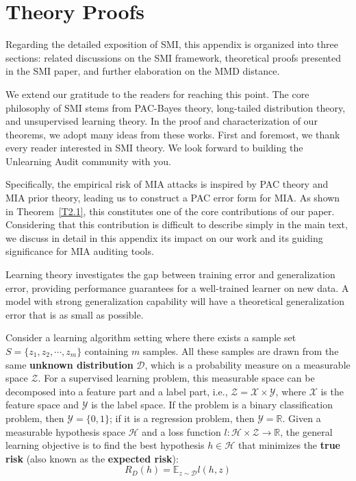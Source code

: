 \documentclass{article}
\theoremstyle{plain}
\theoremstyle{definition}
\theoremstyle{remark}
\begin{document}
\section{Theory Proofs}\label{theory}
Regarding the detailed exposition of SMI, this appendix is organized into three sections: related discussions on the SMI framework, theoretical proofs presented in the SMI paper, and further elaboration on the MMD distance.

We extend our gratitude to the readers for reaching this point. The core philosophy of SMI stems from PAC-Bayes theory, long-tailed distribution theory, and unsupervised learning theory. In the proof and characterization of our theorems, we adopt many ideas from these works. First and foremost, we thank every reader interested in SMI theory. We look forward to building the Unlearning Audit community with you.

Specifically, the empirical risk of MIA attacks is inspired by PAC theory and MIA prior theory, leading us to construct a PAC error form for MIA. As shown in Theorem~\ref{T2.1}, this constitutes one of the core contributions of our paper. Considering that this contribution is difficult to describe simply in the main text, we discuss in detail in this appendix its impact on our work and its guiding significance for MIA auditing tools.

Learning theory investigates the gap between training error and generalization error, providing performance guarantees for a well-trained learner on new data. A model with strong generalization capability will have a theoretical generalization error that is as small as possible.

Consider a learning algorithm setting where there exists a sample set $S = \{z_1, z_2, \cdots, z_m\}$ containing $m$ samples. All these samples are drawn from the same \textbf{unknown distribution} $\mathcal{D}$, which is a probability measure on a measurable space $\mathcal{Z}$. For a supervised learning problem, this measurable space can be decomposed into a feature part and a label part, i.e., $\mathcal{Z} = \mathcal{X} \times \mathcal{Y}$, where $\mathcal{X}$ is the feature space and $\mathcal{Y}$ is the label space. If the problem is a binary classification problem, then $\mathcal{Y} = \{0, 1\}$; if it is a regression problem, then $\mathcal{Y} = \mathbb{R}$. Given a measurable hypothesis space $\mathcal{H}$ and a loss function $l: \mathcal{H} \times \mathcal{Z} \to \mathbb{R}$, the general learning objective is to find the best hypothesis $h \in \mathcal{H}$ that minimizes the \textbf{true risk} (also known as the \textbf{expected risk}):
\begin{equation}
    R_D(h) = \mathbb{E}_{z \sim \mathcal{D}} l(h, z)
\end{equation}
\end{document}
